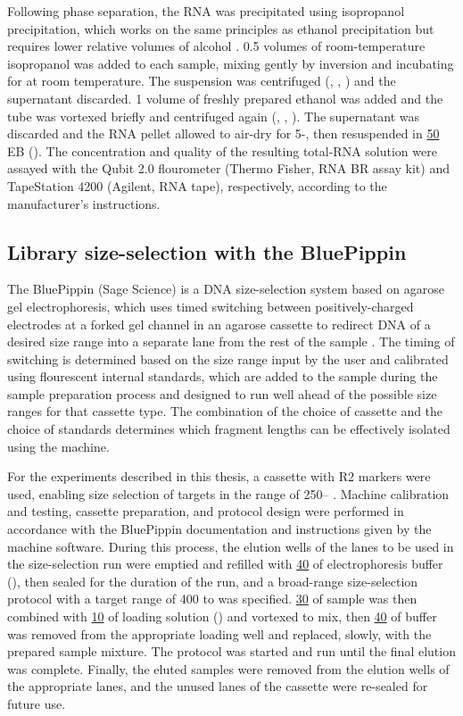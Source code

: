 Following phase separation, the RNA was precipitated using isopropanol precipitation, which works on the same principles as ethanol precipitation but requires lower relative volumes of alcohol \parencite{zumbo2012ethanol}. 0.5 volumes of room-temperature isopropanol was added to each sample, mixing gently by inversion and incubating for  at room temperature. The suspension was centrifuged (, , ) and the supernatant discarded. 1 volume of freshly prepared  ethanol was added and the tube was vortexed briefly and centrifuged again (, , ). The supernatant was discarded and the RNA pellet allowed to air-dry for 5-, then resuspended in \ul{50} EB (). The concentration and quality of the resulting total-RNA solution were assayed with the Qubit 2.0 flourometer (Thermo Fisher, RNA BR assay kit) and TapeStation 4200 (Agilent, RNA tape), respectively, according to the manufacturer's instructions.

\subsection{Library size-selection with the BluePippin}
\label{sec:methods_molec_standard_bluepippin}

The BluePippin (Sage Science) is a DNA size-selection system based on agarose gel electrophoresis, which uses timed switching between positively-charged electrodes at a forked gel channel in an agarose cassette to redirect DNA of a desired size range into a separate lane from the rest of the sample \parencite{sage2016bluepippin}. The timing of switching is determined based on the size range input by the user and calibrated using flourescent internal standards, which are added to the sample during the sample preparation process and designed to run well ahead of the possible size ranges for that cassette type. The combination of the choice of cassette and the choice of standards determines which fragment lengths can be effectively isolated using the machine.

For the experiments described in this thesis, a  cassette with R2 markers were used, enabling size selection of targets in the range of 250-- \parencite{sage2016bluepippin}. Machine calibration and testing, cassette preparation, and protocol design were performed in accordance with the BluePippin documentation and instructions given by the machine software. During this process, the elution wells of the lanes to be used in the size-selection run were emptied and refilled with \ul{40} of electrophoresis buffer (), then sealed for the duration of the run, and a broad-range size-selection protocol with a target range of 400 to  was specified. \ul{30} of sample was then combined with \ul{10} of loading solution () and vortexed to mix, then \ul{40} of buffer was removed from the appropriate loading well and replaced, slowly, with the prepared sample mixture. The protocol was started and run until the final elution was complete. Finally, the eluted samples were removed from the elution wells of the appropriate lanes, and the unused lanes of the cassette were re-sealed for future use.

